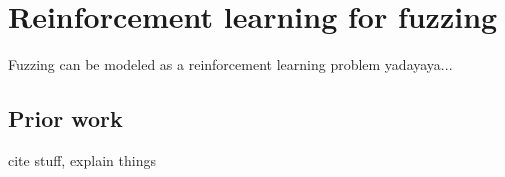 \section{Reinforcement learning for fuzzing}

Fuzzing can be modeled as a reinforcement learning problem yadayaya...

\subsection{Prior work}

cite stuff, explain things
